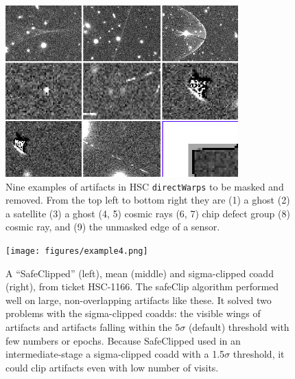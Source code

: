 \documentclass[DM,authoryear,toc]{lsstdoc}
\begin{document}
\begin{figure}
\begin{centering}
\includegraphics[width=0.8\textwidth]{figures/9examples.png}
\par\end{centering}
\caption{\label{fig:NineExamples} Nine examples of artifacts in HSC \texttt{directWarps} to be masked and removed. From the top left to bottom right they are (1) a ghost (2) a satellite (3) a ghost (4, 5)  cosmic rays (6, 7) chip defect group (8) cosmic ray, and (9) the unmasked edge of a sensor.}
\end{figure}

\begin{figure}
\begin{centering}
\texttt{[image: figures/example4.png]}
\par\end{centering}
\caption{\label{fig:safeclip} A ``SafeClipped'' (left), mean (middle) and sigma-clipped coadd (right), from ticket HSC-1166. The safeClip algorithm performed well on large, non-overlapping artifacts like these. It solved two problems with the sigma-clipped coadds: the visible wings of artifacts and artifacts falling within the $5\sigma$ (default) threshold with few numbers or epochs. Because SafeClipped used in an intermediate-stage a sigma-clipped coadd with a 1.5$\sigma$ threshold, it could clip artifacts even with low number of visits.}
\end{figure}
\end{document}
